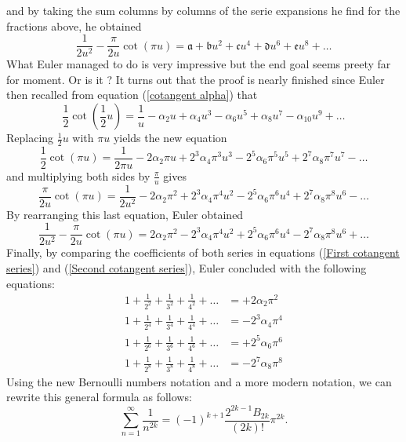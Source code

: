 and by taking the sum columns by columns of the serie expansions he find for the fractions above, he obtained
\begin{equation} \label{First cotangent series}
    \frac{1}{2u^2} - \frac{\pi}{2u}\cot(\pi u) = \mathfrak{a} + \mathfrak{b} u^2 + \mathfrak{c} u^4 + \mathfrak{d}u^6 + \mathfrak{e} u^8 + \dots   
\end{equation}
What Euler managed to do is very impressive but the end goal seems preety far for moment. Or is it ? It turns out that the proof is nearly finished since Euler then recalled from equation (\ref{cotangent alpha}) that
$$ \frac{1}{2}\cot\left(\frac{1}{2}u\right) = \frac{1}{u} - \alpha_2 u + \alpha_4 u^3 - \alpha_6 u^5 + \alpha_8 u^7 - \alpha_{10}u^9 + \dots $$
Replacing $\frac{1}{2}u$ with $\pi u$ yields the new equation
$$\frac{1}{2}\cot(\pi u) = \frac{1}{2\pi u} - 2 \alpha_2 \pi u + 2^3 \alpha_4 \pi^3 u^3 - 2^5 \alpha_6 \pi^5 u^5 + 2^7 \alpha_8 \pi^7 u^7 - \dots $$
and multiplying both sides by $\frac{\pi}{u}$ gives
$$\frac{\pi}{2u}\cot(\pi u) = \frac{1}{2 u^2} - 2 \alpha_2 \pi^2 + 2^3 \alpha_4 \pi^4 u^2 - 2^5 \alpha_6 \pi^6 u^4 + 2^7 \alpha_8 \pi^8 u^6 - \dots$$
By rearranging this last equation, Euler obtained
\begin{equation} \label{Second cotangent series}
    \frac{1}{2 u^2} - \frac{\pi}{2u}\cot(\pi u) = 2 \alpha_2 \pi^2 - 2^3 \alpha_4 \pi^4 u^2 + 2^5 \alpha_6 \pi^6 u^4 - 2^7 \alpha_8 \pi^8 u^6 + \dots
\end{equation}
Finally, by comparing the coefficients of both series in equations (\ref{First cotangent series}) and (\ref{Second cotangent series}), Euler concluded with the following equations:
\begin{align*}
    1 + \frac{1}{2^2} + \frac{1}{3^2} + \frac{1}{4^2} + \dots &= +2 \alpha_2 \pi^2 \\
    1 + \frac{1}{2^4} + \frac{1}{3^4} + \frac{1}{4^4} + \dots &= -2^3 \alpha_4 \pi^4 \\
    1 + \frac{1}{2^6} + \frac{1}{3^6} + \frac{1}{4^6} + \dots &= +2^5 \alpha_6 \pi^6 \\
    1 + \frac{1}{2^8} + \frac{1}{3^8} + \frac{1}{4^8} + \dots &= - 2^7 \alpha_8 \pi^8
\end{align*}
Using the new Bernoulli numbers notation and a more modern notation, we can rewrite this general formula as follows:
\begin{equation} \label{General Formula Euler}
    \boxed{\sum_{n=1}^{\infty}\frac{1}{n^{2k}} = (-1)^{k+1}\frac{2^{2k-1} B_{2k}}{(2k)!}\pi^{2k}.}
\end{equation}

